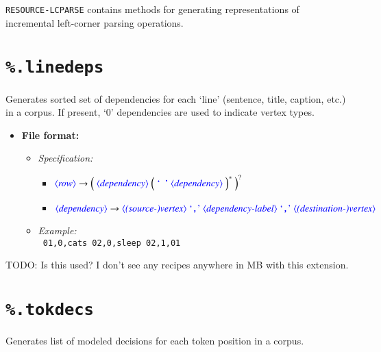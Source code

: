 \documentclass[12pt]{report}
\def\blue{\color{blue}}
\def\magenta{\color{magenta}}
\begin{document}
{\tt RESOURCE-LCPARSE} contains methods for generating representations of incremental left-corner parsing operations.

\section{{\blue\tt \%.linedeps}}
Generates sorted set of dependencies for each `line' (sentence, title, caption, etc.) in a corpus. If present, `0' dependencies are used to indicate vertex types.

\begin{itemize}
      \item \textbf{File format:}
      \begin{itemize}
            \item \textit{Specification:}
            \begin{itemize}
                  \item {\small $\dtype{row}        \rightarrow \Big( \ \dtype{dependency} \ \Big( \ \dcode{\ } \ \dtype{dependency} \ \Big)^* \ \Big)^?$}
                  \item {\small $\dtype{dependency} \rightarrow \dtype{(source-)vertex} \ \dcode{,} \ \dtype{dependency-label} \ \dcode{,} \ \dtype{(destination-)vertex}$}
            \end{itemize}
            \item \textit{Example:}\\
            {\magenta\tt
            01,0,cats 02,0,sleep 02,1,01
            }
      \end{itemize}
\end{itemize}

TODO: Is this used? I don't see any recipes anywhere in MB with this extension.

\section{{\blue\tt \%.tokdecs}}

Generates list of modeled decisions for each token position in a corpus.
\end{document}
